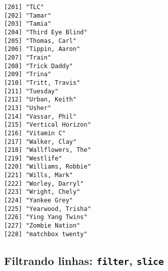 \documentclass[
  letterpaper,
  DIV=11,
  numbers=noendperiod]{scrreprt}
\begin{document}
\begin{itemize}
\begin{verbatim}
[201] "TLC"                           
[202] "Tamar"                         
[203] "Tamia"                         
[204] "Third Eye Blind"               
[205] "Thomas, Carl"                  
[206] "Tippin, Aaron"                 
[207] "Train"                         
[208] "Trick Daddy"                   
[209] "Trina"                         
[210] "Tritt, Travis"                 
[211] "Tuesday"                       
[212] "Urban, Keith"                  
[213] "Usher"                         
[214] "Vassar, Phil"                  
[215] "Vertical Horizon"              
[216] "Vitamin C"                     
[217] "Walker, Clay"                  
[218] "Wallflowers, The"              
[219] "Westlife"                      
[220] "Williams, Robbie"              
[221] "Wills, Mark"                   
[222] "Worley, Darryl"                
[223] "Wright, Chely"                 
[224] "Yankee Grey"                   
[225] "Yearwood, Trisha"              
[226] "Ying Yang Twins"               
[227] "Zombie Nation"                 
[228] "matchbox twenty"               
\end{verbatim}
\end{itemize}

\subsection{\texorpdfstring{Filtrando linhas: \texttt{filter},
\texttt{slice}}{Filtrando linhas: filter, slice}}\label{filtrando-linhas-filter-slice}
\end{document}
